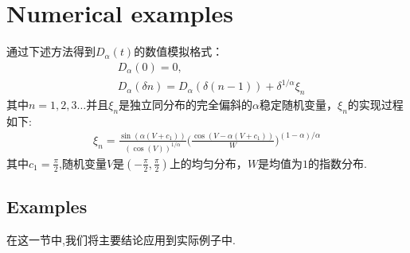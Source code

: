\documentclass[12pt,final]{article}
\numberwithin{equation}{section}
\numberwithin{figure}{section}
\numberwithin{table}{section}
\theoremstyle{plain}
\theoremstyle{definition}
\theoremstyle{remark}
\begin{document}
\section{Numerical examples}
通过下述方法得到$D_\alpha(t)$的数值模拟格式：\\
\begin{align*}
	&D_{\alpha}(0)=0,\\
	&D_{\alpha}(\delta n)=D_{\alpha}(\delta(n-1))+\delta^{1/\alpha}\xi_{n}
\end{align*}
其中$n=1,2,3 \ldots$并且$\xi_n$是独立同分布的完全偏斜的$\alpha$稳定随机变量，$\xi_n$的实现过程如下:
\begin{align*}
	\xi_n=\frac{\sin(\alpha(V+c_1))}{\left(\cos(V)\right)^{1/\alpha}}\Big(\frac{\cos(V-\alpha(V+c_1))}{W}\Big)^{(1-\alpha)/\alpha}
\end{align*}
其中$c_1 = \frac{\pi}{2}$,随机变量$V$是$(-\frac{\pi}{2},\frac{\pi}{2})$上的均匀分布，$W$是均值为$1$的指数分布.
\subsection{Examples}
在这一节中,我们将主要结论应用到实际例子中.
\end{document}

